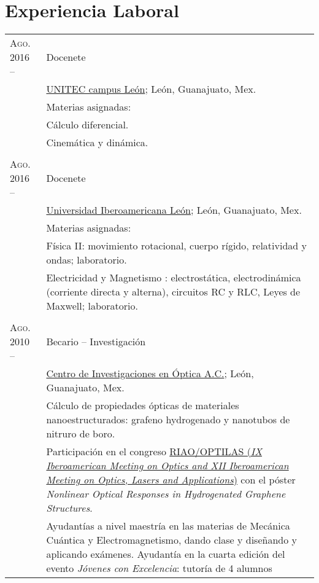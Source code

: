 \documentclass[letterpaper,10pt]{article}
\begin{document}
\section{Experiencia Laboral}
\begin{tabular}{R{4cm}|p{11cm}}
\textsc{Ago. 2016 --  }	&	Docenete \\
						&	\href{http://www.unitec.mx/campus-leon/x}{UNITEC campus Le\'on}; Le\'on, Guanajuato, Mex.\\
						&	\footnotesize{Materias asignadas: }\\
						&\footnotesize{\qquad C\'alculo diferencial. }\\
						&\footnotesize{\qquad Cinem\'atica y din\'amica. }\\
						 \\
\textsc{Ago. 2016 --  }	&	Docenete \\
						&	\href{http://www.leon.uia.mx}{Universidad Iberoamericana Le\'on}; Le\'on, Guanajuato, Mex.\\
						&	\footnotesize{Materias asignadas: }\\
						&\footnotesize{\qquad F\'isica II: movimiento rotacional, cuerpo r\'igido, relatividad y ondas; laboratorio. }\\
						&\footnotesize{\qquad Electricidad y Magnetismo : electrost\'atica, electrodin\'amica (corriente directa y alterna), circuitos RC y RLC, Leyes de Maxwell; laboratorio. }\\
						 \\						
\textsc{Ago. 2010 --}	&	Becario -- Investigaci\'on \\
						&	\href{http://www.cio.mx/}{Centro de Investigaciones en \'Optica A.C.}; Le\'on, Guanajuato, Mex.\\
						&	\footnotesize{C\'alculo de propiedades \'opticas de materiales nanoestructurados: grafeno hydrogenado y nanotubos de nitruro de boro.}\\
						&	\footnotesize{Participaci\'on en el congreso \href{http://riaooptilas.cefop.cl/en/}{RIAO/OPTILAS (\emph{IX Iberoamerican Meeting on Optics and XII Iberoamerican Meeting on Optics, Lasers and Applications})} con el p\'oster \emph{Nonlinear Optical Responses in Hydrogenated Graphene Structures}.}\\
						&	\footnotesize{Ayudant\'ias a nivel maestr\'ia en las materias de Mec\'anica Cu\'antica y Electromagnetismo, dando clase y dise\~nando y aplicando ex\'amenes. Ayudant\'ia en la cuarta edición del evento \emph{J\'ovenes con Excelencia}: tutor\'ia de 4 alumnos}\\

\end{tabular}
\end{document}
